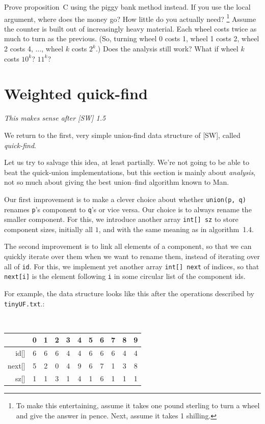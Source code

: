 \documentclass{tufte-handout}
\begin{document}
\begin{ExerciseList}
\Exercise
Prove proposition~C using the piggy bank method instead.
If you use the local argument, where does the money go?
How little do you actually need?
\footnote{To make this entertaining, assume it takes one pound
  sterling to turn a wheel and give the answer in pence.
  Next, assume it takes 1 shilling.}
\Exercise
 Assume the counter is built out of increasingly heavy material. 
 Each wheel costs twice as much to turn as the previous.
 (So, turning wheel 0 costs 1, wheel 1 costs 2, wheel 2 costs 4, 
 $\ldots$,  wheel $k$ costs $2^k$.)
 Does the analysis still work?
 What if wheel $k$ costs $10^k$? $11^k$?
\end{ExerciseList}

\section{Weighted quick-find}

\emph{This makes sense after [SW] 1.5}

\bigskip
We return to the first, very simple union-find data structure of [SW],
called \emph{quick-find}. 

Let us try to salvage this idea, at least partially. We're not going
to be able to beat the quick-union implementations, but this section
is mainly about \emph{analysis}, not so much about giving the best
union--find algorithm known to Man.

Our first improvement is to make a clever choice about whether
\texttt{union(p, q)} renames {\tt p}'s component to {\tt q}'s or vice
versa. 
Our choice is to always rename the smaller component.
For this, we introduce another array {\tt int[] sz} to store component
sizes, initially all $1$, and with the same meaning as in
algorithm~1.4.

The second improvement is to link all elements of a component, so that
we can quickly iterate over them when we want to rename them, instead
of iterating over all of {\tt id}.
For this, we implement yet another array {\tt int[] next} of indices,
so that {\tt next[i]} is the element following {\tt i} in some
circular list of the component ids.

For example, the data structure looks like this after the operations
described by {\tt tinyUF.txt}.:

\medskip
{\tt \small
  \begin{tabular}{rcccccccccc}
      & 0 & 1 & 2 & 3 & 4 & 5 & 6 & 7 & 8 & 9 \\\midrule
id[] & 6 &6 &6 &4 &4 &6 &6 &6 &4 &4 \\
next[] & 5 &2 &0 &4 &9 &6 &7 &1 &3 &8 \\
sz[] &1 &1 &3 &1 &4 &1 &6 &1 &1 &1 
  \end{tabular}}
\medskip
\end{document}

